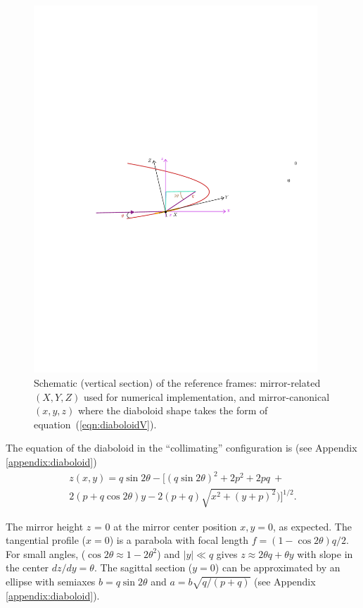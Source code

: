 \documentclass[preprint]{iucr}       %
\begin{document}

\begin{figure}\label{fig:frame}
\includegraphics[width=0.95\textwidth]{figures/fig1.pdf}
%
\caption{Schematic (vertical section) of the reference frames: mirror-related $(X,Y,Z)$ used for numerical implementation, and mirror-canonical $(x,y,z)$ where the diaboloid shape takes the form of equation~(\ref{eqn:diaboloidV}). }
\end{figure}


The equation of the diaboloid in the ``collimating'' configuration is (see Appendix \ref{appendix:diaboloid})
\begin{multline}
\label{eqn:diaboloidV}
z(x,y) = q \sin2\theta - 
[ (q \sin{2\theta})^2 + 2p^2 + 2 p q~+\\
2 (p + q \cos{2\theta}) y - 2 (p+q) \sqrt{x^2 + (y + p)^2}) ]^{1/2}.
\end{multline}

The mirror height $z$ = 0 at the mirror center position $x, y = 0$, as expected. The tangential profile ($x=0$) is a parabola with focal length $ f = (1-\cos2\theta) q/2$. For small angles, ($\cos2\theta\approx 1 - 2\theta^2$) and $|y|\ll q$ gives $z\approx 2 \theta q + \theta y$ with slope in the center $dz/dy=\theta$. The sagittal section ($y=0$) can be approximated by an ellipse with semiaxes $b=q \sin2\theta$ and $a=b \sqrt{q /(p+q)}$ (see Appendix \ref{appendix:diaboloid}). 
\end{document}
